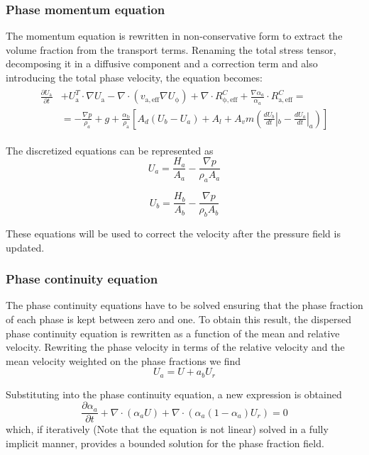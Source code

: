 \documentclass[11pt, a4paper, twoside]{article}
\begin{document}
\subsubsection{Phase momentum equation}
The momentum equation is rewritten in non-conservative form to extract the volume fraction from the transport terms. Renaming the total stress tensor, decomposing it in a diffusive component and a correction term and also introducing the total phase velocity, the equation becomes:
\begin{align}
\begin{split}
\frac{\partial U_\mathrm{a}}{\partial t} & +U_\mathrm{a}^T\cdot \nabla U_\mathrm{a}-\nabla\cdot(v_\mathrm{a,eff}\nabla U_\mathrm{\phi})+\nabla\cdot R_\mathrm{\phi,eff}^C+\frac{\nabla\alpha_a}{\alpha_a}\cdot R_\mathrm{a,eff}^C = \\ 
&= -\frac{\nabla p}{\rho_a}+g+\frac{\alpha_\mathrm{b}}{\rho_\mathrm{a}}[A_d(U_b-U_a)+A_l+A_vm(\frac{dU_b}{dt}|_b-\frac{dU_a}{dt}|_a)]
\end{split}
\end{align}

The discretized equations can be represented as 
\begin{equation}
U_a=\frac{H_a}{A_a}-\frac{\nabla p}{\rho_a A_a}
\end{equation}

\begin{equation}
U_b=\frac{H_b}{A_b}-\frac{\nabla p}{\rho_b A_b}
\end{equation}

These equations will be used to correct the velocity after the pressure field is updated. 

\subsubsection{Phase continuity equation}
The phase continuity equations have to be solved ensuring that the phase fraction of each phase is kept between zero and one. To obtain this result, the dispersed phase continuity equation is rewritten as a function of the mean and relative velocity. Rewriting the phase velocity in terms of the relative velocity and the mean velocity weighted on the phase fractions we find 
\begin{equation}
U_a=U+a_b U_r
\end{equation}

Substituting into the phase continuity equation, a new expression is obtained 
\begin{equation}
\frac{\partial \alpha_a}{\partial t}+\nabla\cdot(\alpha_a U)+\nabla\cdot(\alpha_a(1-\alpha_a)U_r)=0
\end{equation}
which, if iteratively (Note that the equation is not linear) solved in a fully implicit manner, provides a bounded solution for the phase fraction field. 
\end{document}

